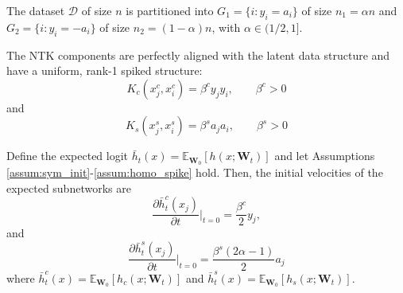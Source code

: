 \documentclass[10pt,a4paper]{amsart}
\begin{document}
\begin{assumption}\label{assum:data_structure}
    The dataset $\mathcal{D}$ of size $n$ is partitioned into $G_1 = \{i : y_i = a_i\}$ of size $n_1 = \alpha n$ and $G_2 = \{i : y_i = -a_i\}$ of size $n_2 = (1-\alpha) n$, with $\alpha \in (1/2, 1]$.
\end{assumption}

\begin{assumption}\label{assum:homo_spike}
    The NTK components are perfectly aligned with the latent data structure and have a uniform, rank-1 spiked structure:
    \begin{equation}
        K_c(x_j^c, x_i^c) = \beta^c y_j y_i, \qquad \beta^c > 0
    \end{equation}
and 
\begin{equation}
    K_s(x_j^s, x_i^s) = \beta^s a_j a_i, \qquad \beta^s > 0
\end{equation}
\end{assumption}

\begin{theorem}\label{thm:homo_velocity}
    Define the expected logit $\bar{h}_t(x) = \mathbb{E}_{\mathbf{W}_0}[h(x; \mathbf{W}_t)]$ and let Assumptions \ref{assum:sym_init}-\ref{assum:homo_spike} hold. Then, the initial velocities of the expected subnetworks are
    \begin{equation}
        \frac{\partial \bar{h}_t^c(x_j)}{\partial t} \Big|_{t=0} = \frac{\beta^c}{2} y_j,
    \end{equation}
    and
\begin{equation}
    \frac{\partial \bar{h}_t^s(x_j)}{\partial t} \Big|_{t=0} = \frac{\beta^s (2\alpha - 1)}{2} a_j
\end{equation}
where $\bar{h}_t^c(x) = \mathbb{E}_{\mathbf{W}_0}[h_c(x; \mathbf{W}_t)]$ and $\bar{h}_t^s(x) = \mathbb{E}_{\mathbf{W}_0}[h_s(x; \mathbf{W}_t)]$.
\end{theorem}
\end{document}
